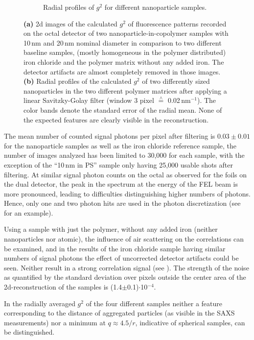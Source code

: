 \begin{figure}
\begin{subfigure}[b]{\textwidth}
\begin{subfigure}[b]{0.49\textwidth}
	\end{subfigure}
			\caption{Radial profiles of $g^2$ for different nanoparticle samples.}
			\end{subfigure}
	\label{fig:resnanorad}
	\caption[Results nanoparticles]{\textbf{(a)} 2d images of the calculated $g^2$ of fluorescence patterns recorded on the octal detector of two nanoparticle-in-copolymer samples with 10\,nm and 20\,nm nominal diameter in comparison to two different baseline samples, (mostly homogeneous in the polymer distributed) iron chloride and the polymer matrix without any added iron. The detector artifacts are almost completely removed in those images. \textbf{(b)} Radial profiles of the calculated $g^2$ of two differently sized nanoparticles in the two different polymer matrices after applying a linear Savitzky-Golay filter (window 3 pixel $\overset{\scriptscriptstyle\wedge}{=}$ 0.02\,nm$^{-1}$). The color bands denote the standard error of the radial mean. None of the expected features are clearly visible in the reconstruction. }
	\label{fig:resnano}
\end{figure}

The mean number of counted signal photons per pixel after filtering is $0.03\pm0.01$ for the nanoparticle samples as well as the iron chloride reference sample, the number of images analyzed has been limited to 30,000 for each sample, with the exception of the \enquote{10\,nm in PS} sample only having 25,000 usable shots after filtering. At similar signal photon counts on the octal as observed for the foils on the dual detector, the peak in the spectrum at the energy of the FEL beam is more pronounced, leading to difficulties distinguishing higher numbers of photons. Hence, only one and two photon hits are used in the photon discretization (see  for an example).

Using a sample with just the polymer, without any added iron (neither nanoparticles nor atomic), the influence of air scattering on the correlations can be examined, and in the results of the iron chloride sample having similar numbers of signal photons the effect of uncorrected detector artifacts could be seen. Neither result in a strong correlation signal (see ). The strength of the noise as quantified by the standard deviation over pixels outside the center area of the 2d-reconstruction of the samples is (1.4$\pm$0.1)$\cdot$10$^{-4}$.

In the radially averaged $g^2$ of the four different samples neither a feature corresponding to the distance of aggregated particles (as visible in the SAXS measurements)  nor a minimum at $q\approx4.5/r$, indicative of spherical samples, can be distinguished. 
\FloatBarrier
